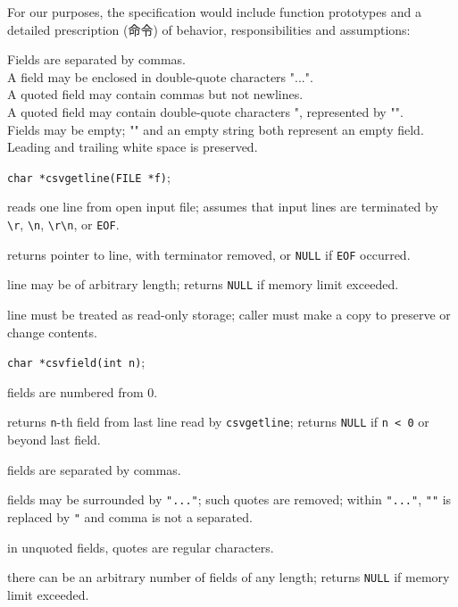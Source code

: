 For our purposes, the specification would include function prototypes and a
detailed prescription (命令) of behavior, responsibilities and assumptions:
\begin{myitemize}
\item Fields are separated by commas. \\
    A field may be enclosed in double-quote characters "...". \\
    A quoted field may contain commas but not newlines. \\
    A quoted field may contain double-quote characters ", represented by
    "".   \\
    Fields may be empty; "" and an empty string both represent an empty
    field. \\
    Leading and trailing white space is preserved.
\item \verb'char *csvgetline(FILE *f)';
    \begin{myitemize}
\item reads one line from open input file; assumes that input lines
    are terminated by \verb'\r', \verb'\n', \verb'\r\n', or \verb'EOF'.
\item returns pointer to line, with terminator removed, or \verb'NULL' if
    \verb'EOF' occurred.
\item line may be of arbitrary length; returns \verb'NULL' if memory
    limit exceeded.
\item line must be treated as read-only storage; caller must make a copy
    to preserve or change contents.
\end{myitemize}
\item \verb'char *csvfield(int n)';
\begin{myitemize}
        \item fields are numbered from 0.
        \item returns \verb'n'-th field from last line read by
            \verb'csvgetline'; returns \verb'NULL' if \verb'n < 0' or
            beyond last field.
        \item fields are separated by commas.
        \item fields may be surrounded by \verb'"..."'; such quotes are
            removed; within \verb'"..."', \verb'""' is replaced by \verb'"'
            and comma is not a separated.
        \item in unquoted fields, quotes are regular characters.
        \item there can be an arbitrary number of fields of any length;
            returns \verb'NULL' if memory limit exceeded.

\end{myitemize}
\end{myitemize}
